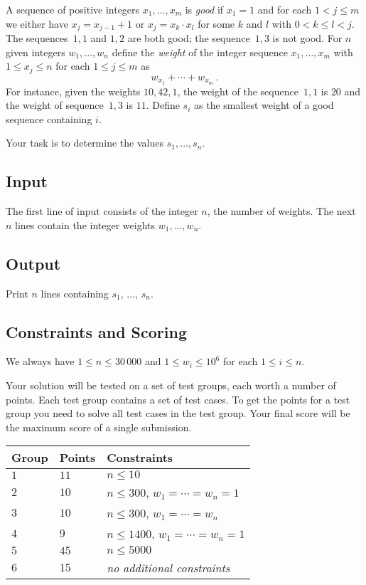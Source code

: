
A sequence of positive integers $x_1,\ldots,x_m$ is \emph{good} if  $x_1 = 1$ and for each $1 < j \leq m$ we either have $x_j=x_{j-1}+1$ or $x_j=x_k\cdot x_l$ for some $k$ and $l$ with $0< k\leq l< j$.
The sequences~$1,1$ and $1,2$ are both good; the sequence~$1,3$ is not good.
For  $n$ given integers $w_1,\ldots,w_n$ define 
the \emph{weight} of the integer sequence $x_1,\ldots,x_m$ with $1\leq x_j \leq n$ for each $1\leq j\leq m$ as
\[ w_{x_1} +\cdots +w_{x_m}\,.\] 
For instance, given the weights $10, 42, 1$, the weight of the sequence~$1,1$ is $20$ and the weight of sequence~$1,3$ is $11$.
Define $s_i$ as the smallest weight of a good sequence containing $i$.

Your task is to determine the values $s_1,\ldots ,s_n$.

\subsection*{Input}

The first line of input consists of the integer $n$, the number of weights.
The next $n$ lines contain the integer weights $w_1, \ldots, w_n$.

\subsection*{Output}

Print $n$ lines containing $s_1$, $\ldots$, $s_n$.

\subsection*{Constraints and Scoring}

We always have
$1\leq n \leq 30\,000$ %
and
$1\leq w_i \leq 10^6$ for each $1\leq i \leq n$.%

Your solution will be tested on a set of test groups, each worth a number of points.
Each test group contains a set of test cases.
To get the points for a test group you need to solve all test cases in the test group.
Your final score will be the maximum score of a single submission.

\medskip
\begin{tabular}{lll}
Group & Points & Constraints \\\hline
$1$   & $11$ & $n\leq 10$ \\
$2$   & $10$ & $n\leq 300$, $w_1=\cdots=w_n = 1$ \\
$3$   & $10$ & $n\leq 300$, $w_1=\cdots=w_n$ \\ %
$4$   & $9$ & $n\leq 1400$, $w_1=\cdots=w_n = 1$ \\
$5$   & $45$ & $n\leq 5000$\\
$6$   & $15$ & \emph{no additional constraints}
\end{tabular}
